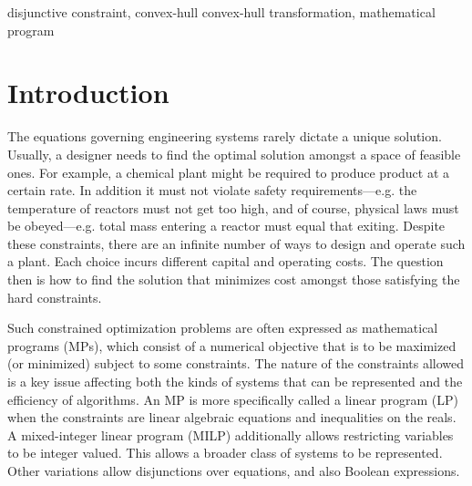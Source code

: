 \documentclass[preprint]{sigplanconf}%
\theoremstyle{remark}
\begin{document}
\terms disjunctive constraint, convex-hull
\keywords convex-hull transformation, mathematical program%


\section{Introduction}

The equations governing engineering systems rarely dictate a unique solution.
Usually, a designer needs to find the optimal solution amongst a space of
feasible ones. For example, a chemical plant might be required to produce
product at a certain rate. In addition it must not violate safety
requirements---e.g. the temperature of reactors must not get too high, and of
course, physical laws must be obeyed---e.g. total mass entering a reactor must
equal that exiting. Despite these constraints, there are an infinite number of
ways to design and operate such a plant. Each choice incurs different capital
and operating costs. The question then is how to find the solution that
minimizes cost amongst those satisfying the hard constraints.

Such constrained optimization problems are often expressed as mathematical
programs (MPs), which consist of a numerical objective that is to be maximized
(or minimized) subject to some constraints. The nature of the constraints
allowed is a key issue affecting both the kinds of systems that can be
represented and the efficiency of algorithms. An MP is more specifically
called a linear program (LP) when the constraints are linear algebraic
equations and inequalities on the reals. A mixed-integer linear program (MILP)
additionally allows restricting variables to be integer valued. This allows a
broader class of systems to be represented. Other variations allow
disjunctions over equations, and also Boolean expressions.
\end{document}
